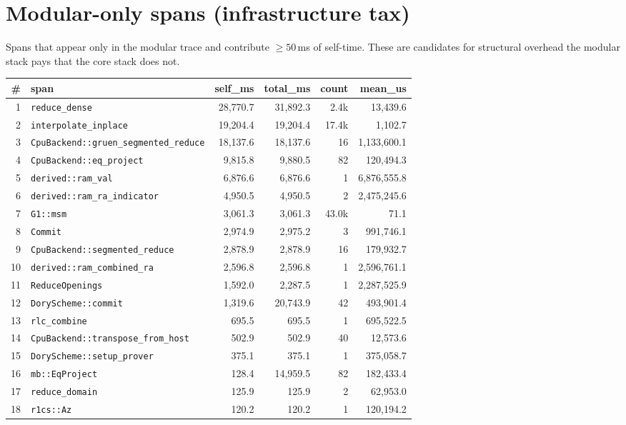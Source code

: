 \documentclass[10pt,a4paper]{article}
\begin{document}
\section{Modular-only spans (infrastructure tax)}
Spans that appear only in the modular trace and contribute $\geq 50$\,ms of self-time. These are candidates for structural overhead the modular stack pays that the core stack does not.
\begin{longtable}{r l r r r r}
\toprule \textbf{\#} & \textbf{span} & \textbf{self\_ms} & \textbf{total\_ms} & \textbf{count} & \textbf{mean\_us} \\ \midrule \endhead
1 & \texttt{reduce\_dense} & 28,770.7 & 31,892.3 & 2.4k & 13,439.6 \\
2 & \texttt{interpolate\_inplace} & 19,204.4 & 19,204.4 & 17.4k & 1,102.7 \\
3 & \texttt{CpuBackend::gruen\_segmented\_reduce} & 18,137.6 & 18,137.6 & 16 & 1,133,600.1 \\
4 & \texttt{CpuBackend::eq\_project} & 9,815.8 & 9,880.5 & 82 & 120,494.3 \\
5 & \texttt{derived::ram\_val} & 6,876.6 & 6,876.6 & 1 & 6,876,555.8 \\
6 & \texttt{derived::ram\_ra\_indicator} & 4,950.5 & 4,950.5 & 2 & 2,475,245.6 \\
7 & \texttt{G1::msm} & 3,061.3 & 3,061.3 & 43.0k & 71.1 \\
8 & \texttt{Commit} & 2,974.9 & 2,975.2 & 3 & 991,746.1 \\
9 & \texttt{CpuBackend::segmented\_reduce} & 2,878.9 & 2,878.9 & 16 & 179,932.7 \\
10 & \texttt{derived::ram\_combined\_ra} & 2,596.8 & 2,596.8 & 1 & 2,596,761.1 \\
11 & \texttt{ReduceOpenings} & 1,592.0 & 2,287.5 & 1 & 2,287,525.9 \\
12 & \texttt{DoryScheme::commit} & 1,319.6 & 20,743.9 & 42 & 493,901.4 \\
13 & \texttt{rlc\_combine} & 695.5 & 695.5 & 1 & 695,522.5 \\
14 & \texttt{CpuBackend::transpose\_from\_host} & 502.9 & 502.9 & 40 & 12,573.6 \\
15 & \texttt{DoryScheme::setup\_prover} & 375.1 & 375.1 & 1 & 375,058.7 \\
16 & \texttt{mb::EqProject} & 128.4 & 14,959.5 & 82 & 182,433.4 \\
17 & \texttt{reduce\_domain} & 125.9 & 125.9 & 2 & 62,953.0 \\
18 & \texttt{r1cs::Az} & 120.2 & 120.2 & 1 & 120,194.2 \\

\end{longtable}
\end{document}
